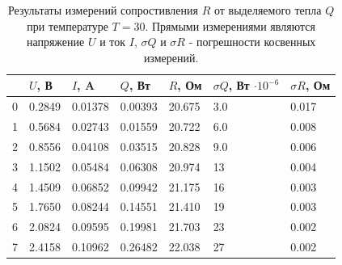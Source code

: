 \documentclass[12pt]{article}
\begin{document}
\begin{table}[H]
    \centering
    \begin{tabular}{|l|l|l|l|l|l|l|}
        \hline
          & $U$, В & $I$, A  & $Q$, Вт & $R$, Ом & $\sigma Q$, Вт $\cdot 10^{-6}$ & $\sigma R$, Ом \\
        \hline
        0 & 0.2849 & 0.01378 & 0.00393 & 20.675  & 3.0                            & 0.017          \\
        1 & 0.5684 & 0.02743 & 0.01559 & 20.722  & 6.0                            & 0.008          \\
        2 & 0.8556 & 0.04108 & 0.03515 & 20.828  & 9.0                            & 0.006          \\
        3 & 1.1502 & 0.05484 & 0.06308 & 20.974  & 13                             & 0.004          \\
        4 & 1.4509 & 0.06852 & 0.09942 & 21.175  & 16                             & 0.003          \\
        5 & 1.7650 & 0.08244 & 0.14551 & 21.410  & 19                             & 0.003          \\
        6 & 2.0824 & 0.09595 & 0.19981 & 21.703  & 23                             & 0.002          \\
        7 & 2.4158 & 0.10962 & 0.26482 & 22.038  & 27                             & 0.002          \\
        \hline
    \end{tabular}
    
    \caption{Результаты измерений сопростивления \(R\) от выделяемого тепла \(Q\) при температуре \(T = 30\)\textcelsius.
        Прямыми измерениями являются напряжение \(U\) и ток \(I\), \(\sigma Q\) и \(\sigma R\) - погрешности косвенных измерений.}
    \label{tab:2}
\end{table}
\end{document}
